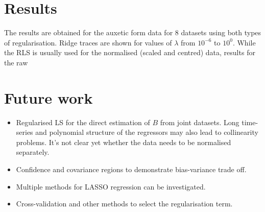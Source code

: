 \documentclass[a4paper,11pt,twoside]{article}
\theoremstyle{mytheoremstyle}
\begin{document}
\section{Results}
\par The results are obtained for the auxetic form data for 8 datasets using both types of regularisation. Ridge traces are shown for values of $\lambda$ from $10^{-6}$ to $10^0$. While the RLS is usually used for the normalised (scaled and centred) data, results for the raw   

\section{Future work}
\begin{itemize}
	\item Regularised LS for the direct estimation of $B$ from joint datasets. Long time-series and polynomial structure of the regressors may also lead to collinearity problems. It's not clear yet whether the data needs to be normalised separately.
	\item Confidence and covariance regions to demonstrate bias-variance trade off.
	\item Multiple methods for LASSO regression can be investigated.
	\item Cross-validation and other methods to select the regularisation term.
\end{itemize}
\end{document}
